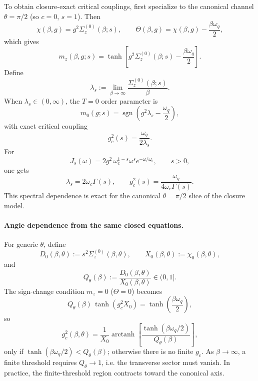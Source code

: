 To obtain closure-exact critical couplings, first specialize to the canonical channel
\(\theta=\pi/2\) (so \(c=0\), \(s=1\)).
Then
\begin{equation}
  \chi(\beta,g)=g^2\Sigma_z^{(0)}(\beta;s),
  \qquad
  \Theta(\beta,g)=\chi(\beta,g)-\frac{\beta\omega_q}{2},
\end{equation}
which gives
\begin{equation}
  m_z(\beta,g;s)=\tanh\!\left[g^2\Sigma_z^{(0)}(\beta;s)-\frac{\beta\omega_q}{2}\right].
\end{equation}
Define
\begin{equation}
  \lambda_s:=\lim_{\beta\to\infty}\frac{\Sigma_z^{(0)}(\beta;s)}{\beta}.
\end{equation}
When \(\lambda_s\in(0,\infty)\), the \(T=0\) order parameter is
\begin{equation}
  m_0(g;s)=\operatorname{sgn}\!\left(g^2\lambda_s-\frac{\omega_q}{2}\right),
\end{equation}
with exact critical coupling
\begin{equation}
  g_c^2(s)=\frac{\omega_q}{2\lambda_s}.
  \label{eq:gc_exact_lambda_v2}
\end{equation}
For
\begin{equation}
  J_s(\omega)=2g^2\,\omega_c^{1-s}\omega^s e^{-\omega/\omega_c},\qquad s>0,
\end{equation}
one gets
\begin{equation}
  \lambda_s=2\omega_c\Gamma(s),
  \qquad
  g_c^2(s)=\frac{\omega_q}{4\omega_c\Gamma(s)}.
  \label{eq:gc_exact_gamma_v2}
\end{equation}
This spectral dependence is exact for the canonical \(\theta=\pi/2\) slice of the closure model.

\paragraph{Angle dependence from the same closed equations.}
For generic \(\theta\), define
\begin{equation}
  D_0(\beta,\theta):=s^2\Sigma_z^{(0)}(\beta,\theta),\qquad
  X_0(\beta,\theta):=\chi_0(\beta,\theta),
\end{equation}
and
\begin{equation}
  Q_\theta(\beta):=\frac{D_0(\beta,\theta)}{X_0(\beta,\theta)}\in(0,1].
\end{equation}
The sign-change condition \(m_z=0\) (\(\Theta=0\)) becomes
\begin{equation}
  Q_\theta(\beta)\,\tanh(g_c^2X_0)=\tanh\!\left(\frac{\beta\omega_q}{2}\right),
  \label{eq:gc_angle_condition_v2}
\end{equation}
so
\begin{equation}
  g_c^2(\beta,\theta)=\frac{1}{X_0}\operatorname{arctanh}
  \!\left[\frac{\tanh(\beta\omega_q/2)}{Q_\theta(\beta)}\right],
  \label{eq:gc_angle_finite_beta_v2}
\end{equation}
only if \(\tanh(\beta\omega_q/2)<Q_\theta(\beta)\); otherwise there is no finite \(g_c\).
As \(\beta\to\infty\), a finite threshold requires \(Q_\theta\to1\), i.e. the transverse sector must
vanish. In practice, the finite-threshold region contracts toward the canonical axis.


